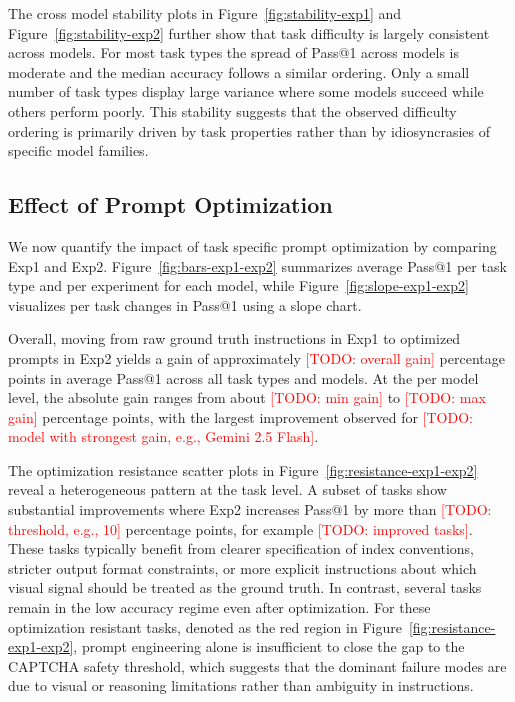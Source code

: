\documentclass[sigconf, review]{acmart}
\begin{document}
The cross model stability plots in Figure~\ref{fig:stability-exp1} and Figure~\ref{fig:stability-exp2} further show that task difficulty is largely consistent across models. For most task types the spread of Pass@1 across models is moderate and the median accuracy follows a similar ordering. Only a small number of task types display large variance where some models succeed while others perform poorly. This stability suggests that the observed difficulty ordering is primarily driven by task properties rather than by idiosyncrasies of specific model families.

\subsection{Effect of Prompt Optimization}

We now quantify the impact of task specific prompt optimization by comparing Exp1 and Exp2. Figure~\ref{fig:bars-exp1-exp2} summarizes average Pass@1 per task type and per experiment for each model, while Figure~\ref{fig:slope-exp1-exp2} visualizes per task changes in Pass@1 using a slope chart.

Overall, moving from raw ground truth instructions in Exp1 to optimized prompts in Exp2 yields a gain of approximately \textcolor{red}{[TODO: overall gain]} percentage points in average Pass@1 across all task types and models. At the per model level, the absolute gain ranges from about \textcolor{red}{[TODO: min gain]} to \textcolor{red}{[TODO: max gain]} percentage points, with the largest improvement observed for \textcolor{red}{[TODO: model with strongest gain, e.g., Gemini 2.5 Flash]}.

The optimization resistance scatter plots in Figure~\ref{fig:resistance-exp1-exp2} reveal a heterogeneous pattern at the task level. A subset of tasks show substantial improvements where Exp2 increases Pass@1 by more than \textcolor{red}{[TODO: threshold, e.g., 10]} percentage points, for example \textcolor{red}{[TODO: improved tasks]}. These tasks typically benefit from clearer specification of index conventions, stricter output format constraints, or more explicit instructions about which visual signal should be treated as the ground truth. In contrast, several tasks remain in the low accuracy regime even after optimization. For these optimization resistant tasks, denoted as the red region in Figure~\ref{fig:resistance-exp1-exp2}, prompt engineering alone is insufficient to close the gap to the CAPTCHA safety threshold, which suggests that the dominant failure modes are due to visual or reasoning limitations rather than ambiguity in instructions.
\end{document}
